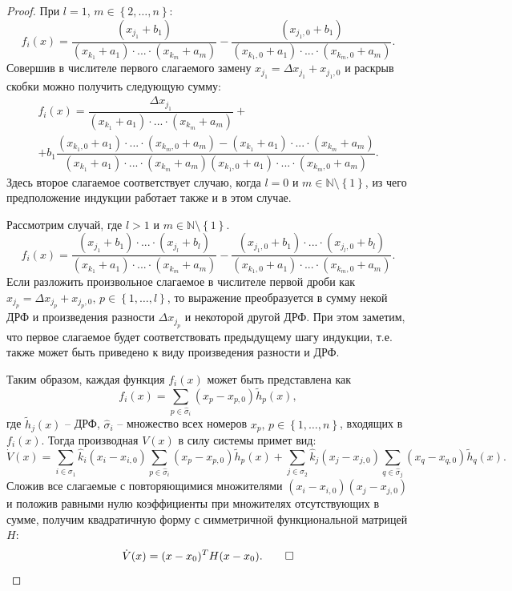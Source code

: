 \documentclass[14pt,a4paper]{extarticle}
\begin{document}
\begin{proof}
		При $l=1$, $m\in\left\{2,\dots,n\right\}$:
		\[f_i(x)=\dfrac{(x_{j_1}+b_1)}{(x_{k_1}+a_1)\cdot...\cdot(x_{k_m}+a_m)}-\dfrac{(x_{j_1,0}+b_1)}{(x_{k_1,0}+a_1)\cdot...\cdot(x_{k_m,0}+a_m)}.\]
		Совершив в числителе первого слагаемого замену $x_{j_1}=\Delta x_{j_1} + x_{j_1,0}$ и раскрыв скобки можно получить следующую сумму:
		\begin{multline*}
			f_i(x)=\dfrac{\Delta x_{j_1}}{(x_{k_1}+a_1)\cdot...\cdot(x_{k_m}+a_m)}+\\
			+b_1\dfrac{(x_{k_1,0}+a_1)\cdot...\cdot(x_{k_m,0}+a_m)-(x_{k_1}+a_1)\cdot...\cdot(x_{k_m}+a_m)}{(x_{k_1}+a_1)\cdot...\cdot(x_{k_m}+a_m)(x_{k_1,0}+a_1)\cdot...\cdot(x_{k_m,0}+a_m)}.
		\end{multline*}
		Здесь второе слагаемое соответствует случаю, когда $l=0$ и $m\in\mathbb{N}\setminus\left\{1\right\}$, из чего предположение индукции работает также и в этом случае. 
		
		Рассмотрим случай, где $l > 1$ и $m\in\mathbb{N}\setminus\left\{1\right\}$.
		\[f_i(x)=\dfrac{(x_{j_1}+b_1)\cdot...\cdot(x_{j_l}+b_l)}{(x_{k_1}+a_1)\cdot...\cdot(x_{k_m}+a_m)}-\dfrac{(x_{j_1,0}+b_1)\cdot...\cdot(x_{j_l,0}+b_l)}{(x_{k_1,0}+a_1)\cdot...\cdot(x_{k_m,0}+a_m)}.\]
		Если разложить произвольное слагаемое в числителе первой дроби как $x_{j_p}=\Delta x_{j_p} + x_{j_p,0},\, p\in\left\{1,\dots,l\right\}$, то выражение преобразуется в сумму некой ДРФ и произведения разности $\Delta x_{j_p}$ и некоторой другой ДРФ. При этом заметим, что первое слагаемое будет соответствовать предыдущему шагу индукции, т.е. также может быть приведено к виду произведения разности и ДРФ.
		
		Таким образом, каждая функция $f_i(x)$ может быть представлена как
		\[f_i(x)=\sum\limits_{p\in\hat{\sigma}_i}(x_p-x_{p,0})\tilde{h}_p(x),\]    
		где $\tilde{h}_j(x)$ -- ДРФ, $\hat{\sigma}_i$ -- множество всех номеров $x_p,\, p\in\left\{1,\dots,n\right\}$, входящих в $f_i(x)$. Тогда производная $V(x)$ в силу системы примет вид:
		\[\dot{V}(x)=\sum\limits_{i\in\sigma_1}\hat{k}_i(x_i-x_{i,0})\sum\limits_{p\in\hat{\sigma}_i}(x_p-x_{p,0})\tilde{h}_{p}(x)+\sum\limits_{j\in\sigma_2}\hat{k}_j(x_j-x_{j,0})\sum\limits_{q\in\hat{\sigma}_j}(x_q-x_{q,0})\tilde{h}_{q}(x).\]
		Сложив все слагаемые с повторяющимися множителями $(x_i-x_{i,0})(x_j-x_{j,0})$ и положив равными нулю коэффициенты при множителях отсутствующих в сумме, получим квадратичную форму с симметричной функциональной матрицей $H$:
		\[\dot{V}(x)=(x-x_0)^{T}H(x-x_0).\qed\]
	\end{proof}			
	
\end{document}
